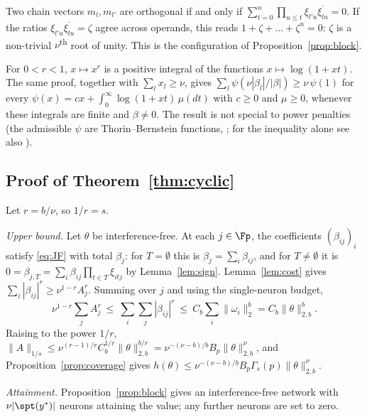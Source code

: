 \begin{remark}
Two chain vectors $m_l,m_{l'}$ are orthogonal if and only if $\sum_{t=0}^n\prod_{u\le t}\xi_{l'u}\overline{\xi_{lu}}=0$. If the ratios $\xi_{l'u}\overline{\xi_{lu}}=\zeta$ agree across operands, this reads $1+\zeta+\dots+\zeta^n=0$: $\zeta$ is a non-trivial $\nu$\textsuperscript{th} root of unity. This is the configuration of Proposition~\ref{prop:block}.
\end{remark}

\begin{remark}
For $0<r<1$, $x\mapsto x^r$ is a positive integral of the functions $x\mapsto\log(1+xt)$. The same proof, together with $\sum_lx_l\ge\nu$, gives $\sum_l\psi(\nu|\beta_l|/|\beta|)\ge\nu\,\psi(1)$ for every $\psi(x)=cx+\int_0^\infty\log(1+xt)\,\mu(dt)$ with $c\ge0$ and $\mu\ge0$, whenever these integrals are finite and $\beta\neq0$. The result is not special to power penalties (the admissible $\psi$ are Thorin--Bernstein functions, \citealp[Ch.~8]{schilling2012bernstein}; for the inequality alone see also \citealp{thompson1976convex}).
\end{remark}

\subsection{Proof of Theorem~\ref{thm:cyclic}}\label{app:thm}

Let $r=b/\nu$, so $1/r=s$.

\emph{Upper bound.} Let $\theta$ be interference-free. At each $j\in\Fp$, the coefficients $(\beta_{ij})_i$ satisfy \eqref{eq:JF} with total $\beta_j$: for $T=\emptyset$ this is $\beta_j=\sum_i\beta_{ij}$, and for $T\neq\emptyset$ it is $0=\beta_{j,T}=\sum_i\beta_{ij}\prod_{t\in T}\xi_{itj}$ by Lemma~\ref{lem:sign}. Lemma~\ref{lem:cost} gives $\sum_i|\beta_{ij}|^r\ge\nu^{1-r}A_j^r$. Summing over $j$ and using the single-neuron budget,
\begin{equation}
\nu^{1-r}\sum_jA_j^r\ \le\ \sum_i\sum_j|\beta_{ij}|^r\ \le\ C_b\sum_i\|\omega_i\|_2^b=C_b\|\theta\|_{2,b}^b .
\label{eq:chain}
\end{equation}
Raising to the power $1/r$, $\|A\|_{1/s}\le\nu^{(r-1)/r}C_b^{1/r}\|\theta\|_{2,b}^{b/r}=\nu^{-(\nu-b)/b}B_p\|\theta\|_{2,b}^{\nu}$, and Proposition~\ref{prop:coverage} gives $h(\theta)\le\nu^{-(\nu-b)/b}B_p\Gamma_s(p)\|\theta\|_{2,b}^\nu$.

\emph{Attainment.} Proposition~\ref{prop:block} gives an interference-free network with $\nu|\spt(y^*)|$ neurons attaining the value; any further neurons are set to zero.

